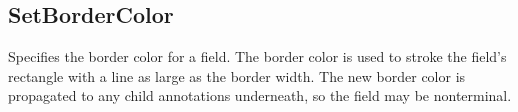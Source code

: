 \documentclass[letterpaper,12pt,english,openany,oneside]{sphinxmanual}
\begin{document}
\subsection{SetBorderColor}
\label{\detokenize{IAC_API_FormsIntro:setbordercolor}}
Specifies the border color for a field. The border color is used to stroke the field’s rectangle with a line as large as the border width. The new border color is propagated to any child annotations underneath, so the field may be non\sphinxhyphen{}terminal.

\label{\detokenize{IAC_API_FormsIntro:syntax-2}}

\begin{sphinxVerbatim}[commandchars=\\\{\}]
            
\end{sphinxVerbatim}
\label{\detokenize{IAC_API_FormsIntro:parameters-2}}
\end{document}
